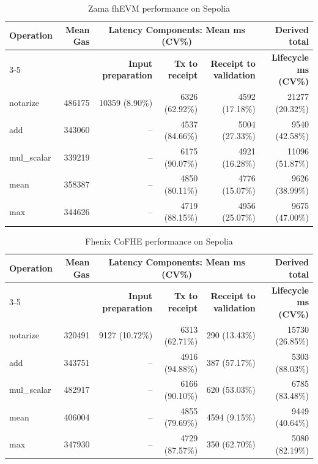 \begin{table}[!t]
\caption{Zama fhEVM performance on Sepolia}
\label{tab:zama-fhevm-sepolia-benchmark}
\centering
\scriptsize
\setlength{\tabcolsep}{4pt}
\begin{tabular}{|l|r|rrr|r|}
\hline
\textbf{Operation} &
\textbf{Mean Gas} &
\multicolumn{3}{c|}{\textbf{Latency Components: Mean ms (CV\%)}} &
\textbf{Derived total} \\
\cline{3-5}
&
&
\textbf{Input preparation} &
\textbf{Tx to receipt} &
\textbf{Receipt to validation} &
\textbf{Lifecycle ms (CV\%)} \\
\hline

notarize & 486175 & 10359 (8.90\%) & 6326 (62.92\%) & 4592 (17.18\%) & 21277 (20.32\%) \\
add & 343060 & -- & 4537 (84.66\%) & 5004 (27.33\%) & 9540 (42.58\%) \\
mul\_scalar & 339219 & -- & 6175 (90.07\%) & 4921 (16.28\%) & 11096 (51.87\%) \\
mean & 358387 & -- & 4850 (80.11\%) & 4776 (15.07\%) & 9626 (38.99\%) \\
max & 344626 & -- & 4719 (88.15\%) & 4956 (25.07\%) & 9675 (47.00\%) \\
\hline
\end{tabular}
\end{table}

\begin{table}[!t]
\caption{Fhenix CoFHE performance on Sepolia}
\label{tab:fhenix-cofhe-sepolia-benchmark}
\centering
\scriptsize
\setlength{\tabcolsep}{4pt}
\begin{tabular}{|l|r|rrr|r|}
\hline
\textbf{Operation} &
\textbf{Mean Gas} &
\multicolumn{3}{c|}{\textbf{Latency Components: Mean ms (CV\%)}} &
\textbf{Derived total} \\
\cline{3-5}
&
&
\textbf{Input preparation} &
\textbf{Tx to receipt} &
\textbf{Receipt to validation} &
\textbf{Lifecycle ms (CV\%)} \\
\hline

notarize & 320491 & 9127 (10.72\%) & 6313 (62.71\%) & 290 (13.43\%) & 15730 (26.85\%) \\
add & 343751 & -- & 4916 (94.88\%) & 387 (57.17\%) & 5303 (88.03\%) \\
mul\_scalar & 482917 & -- & 6166 (90.10\%) & 620 (53.03\%) & 6785 (83.48\%) \\
mean & 406004 & -- & 4855 (79.69\%) & 4594 (9.15\%) & 9449 (40.64\%) \\
max & 347930 & -- & 4729 (87.57\%) & 350 (62.70\%) & 5080 (82.19\%) \\
\hline
\end{tabular}
\end{table}

